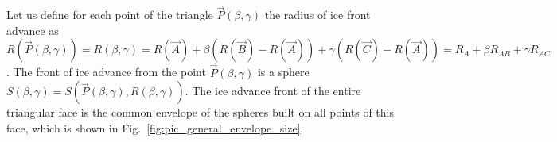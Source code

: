 \documentclass[
11pt,%
tightenlines,%
twoside,%
onecolumn,%
nofloats,%
nobibnotes,%
nofootinbib,%
superscriptaddress,%
noshowpacs,%
centertags]%
{revtex4-2}
\begin{document}
Let us define for each point of the triangle $\vec{P}(\beta, \gamma)$ the radius of ice front advance as $R(\vec{P}(\beta, \gamma)) = R(\beta, \gamma) = R(\vec{A}) + \beta (R(\vec{B}) - R(\vec{A})) + \gamma (R(\vec{C}) - R(\vec{A} )) = R_A + \beta R_{AB} + \gamma R_{AC}$.
The front of ice advance from the point $\vec{P}(\beta, \gamma)$ is a sphere $S(\beta, \gamma) = S(\vec{P}(\beta, \gamma), R(\beta,\gamma))$.
The ice advance front of the entire triangular face is  the common
envelope of the spheres built on all points of this face, which is
shown in Fig.~\ref{fig:pic_general_envelope_size}.
\end{document}
